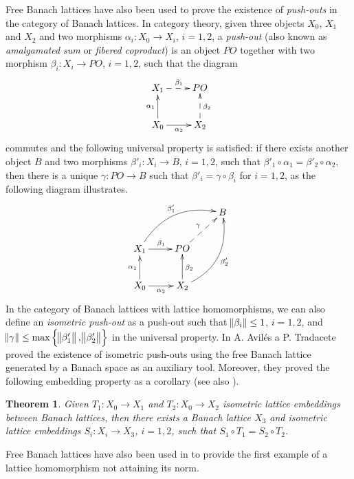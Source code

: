 \documentclass[12pt,leqno]{amsart}
\numberwithin{equation}{section} %
\newtheorem{thm}{Theorem}[section]
\theoremstyle{definition}
\numberwithin{equation}{section}
\begin{document}
Free Banach lattices have also been used to prove the existence of \textit{push-outs} in the category of Banach lattices. In category theory, given three objects $X_0$, $X_1$ and $X_2$ and two morphisms $\alpha_i:X_0\rightarrow X_i$, $i=1,2$, a \textit{push-out} (also known as \textit{amalgamated sum} or \textit{fibered coproduct}) is an object $PO$ together with two morphism $\beta_i:X_i\rightarrow PO$, $i=1,2$, such that the diagram
$$
\xymatrix{X_1\ar@{-->}^{\beta_1}[r]& PO\\
    X_0\ar_{\alpha_2}[r]\ar^{\alpha_1}[u]& X_2 \ar@{-->}_{\beta_2}[u]}
$$
commutes and the following universal property is satisfied: if there exists another object $B$ and two morphisms $\beta'_i:X_i\rightarrow B$, $i=1,2$, such that $\beta'_1\circ \alpha_1=\beta'_2\circ \alpha_2$, then there is a unique $\gamma:PO\rightarrow B$ such that $\beta'_i= \gamma\circ \beta_i$ for $i=1,2$, as the following diagram illustrates.
$$
\xymatrix{ & & B\\
    X_1\ar^{\beta_1}[r] \ar^{\beta'_1}@/^1.5pc/[rru]& PO \ar@{-->}^{\gamma}[ru] &\\
    X_0\ar_{\alpha_2}[r]\ar^{\alpha_1}[u]& X_2 \ar_{\beta_2}[u] \ar_{\beta'_2}@/_1.5pc/[ruu] &}
$$
In the category of Banach lattices with lattice homomorphisms, we can also define an \textit{isometric push-out} as a push-out such that $\norm{\beta_i}\leq 1$, $i=1,2$, and $\norm{\gamma}\leq \max\cbr{\norm{\beta'_1},\norm{\beta'_2}}$ in the universal property. In \cite[Theorem 4.3]{AT} A. Avil\'es a P. Tradacete proved the existence of isometric push-outs using the free Banach lattice generated by a Banach space as an auxiliary tool. Moreover, they proved the following embedding property as a corollary (see also \cite{Tursi}).

\begin{thm}\label{theo: amalgamation embedding of BL}
    Given $T_1:X_0\rightarrow X_1$ and $T_2:X_0\rightarrow X_2$ isometric lattice embeddings between Banach lattices, then there exists a Banach lattice $X_3$ and isometric lattice embeddings $S_i: X_i\rightarrow X_3$, $i=1,2$, such that $S_1\circ T_1=S_2\circ T_2$.
\end{thm}


Free Banach lattices have also been used in \cite{Norm-attaining} to provide the first example of a lattice homomorphism not attaining its norm.



\end{document}
